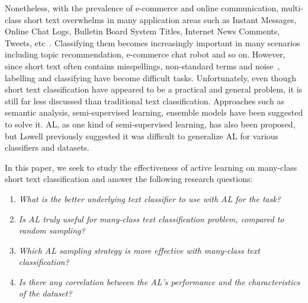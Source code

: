 Nonetheless, with the prevalence of e-commerce and online communication, multi-class short text overwhelms in many application areas such as Instant Messages, Online Chat Logs, Bulletin Board System Titles, Internet News Comments, Tweets, etc~\cite{song2014short}. Classifying them becomes increasingly important in many scenarios including
topic recommendation, e-commerce chat robot and so on. However, since short text often contains misspellings, non-standard terms and noise~\cite{yan2009dynamic}, labelling and classifying have become difficult tasks. 
Unfortunately, even though short text classification have appeared to be a practical and general problem, it is still far less discussed than traditional text classification. Approaches such as semantic analysis, semi-supervised learning, ensemble models have been suggested to solve it. AL, as one kind of 
semi-supervised learning, has also been proposed, 
but Lowell\cite{lowell2019practical} previously suggested it was difficult to 
generalize AL for various classifiers and datasets.

In this paper, we seek to study the effectiveness of active learning on many-class short text classification and answer the following
research questions:

\begin{enumerate}[label=(\alph*)]
\item \textit{What is the better underlying text classifier to use with AL for the task?}
\item \textit{Is AL truly useful for many-class text classification problem,
compared to random sampling?}
\item \textit{Which AL sampling strategy is more effective with many-class text classification?}
\item \textit{Is there any correlation between the AL's performance and the
characteristics of the dataset?}
\end{enumerate}

